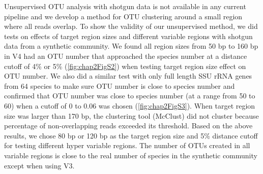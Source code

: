 \documentclass[]{msu-thesis}
\begin{document}
Unsupervised OTU analysis with shotgun data is not available in any current pipeline and we develop a method for OTU clustering around a small region where all reads overlap. To show the validity of our unsupervised method, we did tests on effects of target region sizes and different variable regions with shotgun data from a synthetic community. We found all region sizes from 50 bp to 160 bp in V4 had an OTU number that approached the species number at a distance cutoff of 4\% or 5\% (\cref{fig:chap2FigS2}) when testing target region size effect on OTU number. We also did a similar test with only full length SSU rRNA genes from 64 species to make sure OTU number is close to species number and confirmed that OTU number was close to species number (at a range from 50 to 60) when a cutoff of 0 to 0.06 was chosen (\cref{fig:chap2FigS3}). When target region size was larger than 170 bp, the clustering tool (McClust) \cite{cole_ribosomal_2014} did not cluster because percentage of non-overlapping reads exceeded its threshold. Based on the above results, we chose 80 bp or 120 bp as the target region size and 5\% distance cutoff for testing different hyper variable regions. The number of OTUs created in all variable regions is close to the real number of species in the synthetic community except when using V3.
\end{document}
